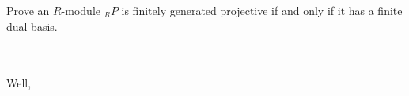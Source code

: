Prove an $R$-module $_RP$ is finitely generated projective if and only if it has a finite dual basis.\\\\

\begin{solution}\renewcommand{\qedsymbol}{}\ \\
    Well,
\end{solution}